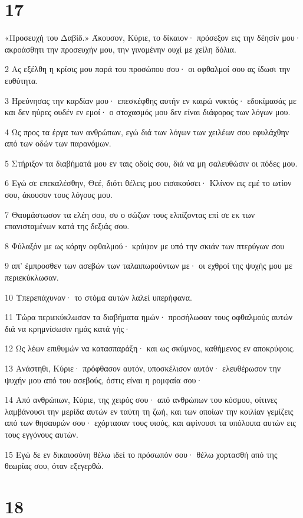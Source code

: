 \chapter{17}

\par «Προσευχή του Δαβίδ.» Άκουσον, Κύριε, το δίκαιον· πρόσεξον εις την δέησίν μου· ακροάσθητι την προσευχήν μου, την γινομένην ουχί με χείλη δόλια.
\par 2 Ας εξέλθη η κρίσις μου παρά του προσώπου σου· οι οφθαλμοί σου ας ίδωσι την ευθύτητα.
\par 3 Ηρεύνησας την καρδίαν μου· επεσκέφθης αυτήν εν καιρώ νυκτός· εδοκίμασάς με και δεν ηύρες ουδέν εν εμοί· ο στοχασμός μου δεν είναι διάφορος των λόγων μου.
\par 4 Ως προς τα έργα των ανθρώπων, εγώ διά των λόγων των χειλέων σου εφυλάχθην από των οδών των παρανόμων.
\par 5 Στήριξον τα διαβήματά μου εν ταις οδοίς σου, διά να μη σαλευθώσιν οι πόδες μου.
\par 6 Εγώ σε επεκαλέσθην, Θεέ, διότι θέλεις μου εισακούσει· Κλίνον εις εμέ το ωτίον σου, άκουσον τους λόγους μου.
\par 7 Θαυμάστωσον τα ελέη σου, συ ο σώζων τους ελπίζοντας επί σε εκ των επανισταμένων κατά της δεξιάς σου.
\par 8 Φύλαξόν με ως κόρην οφθαλμού· κρύψον με υπό την σκιάν των πτερύγων σου
\par 9 απ' έμπροσθεν των ασεβών των ταλαιπωρούντων με· οι εχθροί της ψυχής μου με περιεκύκλωσαν.
\par 10 Υπερεπάχυναν· το στόμα αυτών λαλεί υπερήφανα.
\par 11 Τώρα περιεκύκλωσαν τα διαβήματα ημών· προσήλωσαν τους οφθαλμούς αυτών διά να κρημνίσωσιν ημάς κατά γής·
\par 12 Ως λέων επιθυμών να κατασπαράξη· και ως σκύμνος, καθήμενος εν αποκρύφοις.
\par 13 Ανάστηθι, Κύριε· πρόφθασον αυτόν, υποσκέλισον αυτόν· ελευθέρωσον την ψυχήν μου από του ασεβούς, όστις είναι η ρομφαία σου·
\par 14 Από ανθρώπων, Κύριε, της χειρός σου· από ανθρώπων του κόσμου, οίτινες λαμβάνουσι την μερίδα αυτών εν ταύτη τη ζωή, και των οποίων την κοιλίαν γεμίζεις από των θησαυρών σου· εχόρτασαν τους υιούς, και αφίνουσι τα υπόλοιπα αυτών εις τους εγγόνους αυτών.
\par 15 Εγώ δε εν δικαιοσύνη θέλω ιδεί το πρόσωπόν σου· θέλω χορτασθή από της θεωρίας σου, όταν εξεγερθώ.

\chapter{18}

